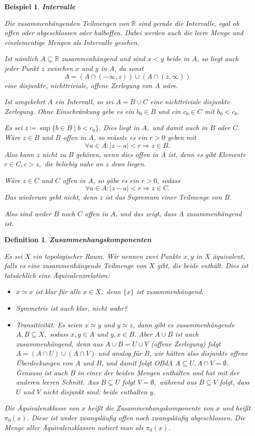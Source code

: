 \documentclass[12pt]{scrbook}   %
\newtheorem{definiX}[alles]{Definition}
\newenvironment{defini}[1]{\begin{definiX}{\bf #1}\par\rm}{\end{definiX}}
\newtheorem{bspX}[alles]{Beispiel}
\newenvironment{bsp}[1]{\begin{bspX}{\bf #1}\par\rm}{\end{bspX}}
\newcommand{\da}{\coloneqq}
\begin{document}
\begin{bsp}{Intervalle}
Die zusammenhängenden Teilmengen von $\mathbb R$ sind gerade die 
Intervalle, egal ob offen oder abgeschlossen oder halboffen. Dabei werden auch 
die leere Menge und einelementige Mengen als Intervalle gesehen.

Ist nämlich $A\subseteq \mathbb R$ zusammenhängend und sind 
$x<y$ beide in $A$, so liegt auch jeder Punkt $z$ zwischen $x$ und $y$ in $A$,
da sonst 
$$A = (A\cap(-\infty,z)) \cup (A\cap (z,\infty))$$
eine disjunkte, nichttriviale, offene Zerlegung von $A$ wäre.

Ist umgekehrt $A$ ein Intervall, so sei $A=B\cup C$ eine nichttriviale
disjunkte Zerlegung. Ohne Einschränkung gebe es ein $b_0\in B$ und ein 
$c_0\in C$ mit $b_0<c_0.$ 

Es sei $z\da \sup\{b\in B\mid b<c_0\}.$ Dies liegt in $A,$ und damit auch in 
$B$ oder $C.$ Wäre $z\in B$ und $B$ offen in $A$, so müsste es ein $r>0$ 
geben mit
$$\forall a\in A: |z-a| < r \Rightarrow z\in B.$$
Also kann $z$ nicht zu $B$ gehören, wenn dies offen in $A$ ist, denn es gibt 
Elemente $c\in C, c>z,$ die beliebig nahe an $z$ dran liegen. 

Wäre $z\in C$ und $C$ offen in $A$, so gäbe es ein $r>0$, sodass
$$\forall a\in A: |z-a| < r \Rightarrow z\in C.$$
Das wiederum geht nicht, denn $z$ ist das Supremum einer Teilmenge von $B.$

Also sind weder $B$ noch $C$ offen in $A$, und das zeigt, dass $A$ 
zusammenhängend ist.

\end{bsp}

\begin{defini}{Zusammenhangskomponenten}
Es sei $X$ ein topologischer Raum. Wir nennen zwei Punkte $x,y$ in $X$
{\it äquivalent}, falls es eine zusammenhängende Teilmenge von $X$ gibt, 
die beide enthält. Dies ist tatsächlich eine Äquivalenzrelation:
\begin{itemize}
\item $x\simeq x$ ist klar für alle $x\in X,$ denn $\{x\}$ ist 
zusammenhängend. 
\item Symmetrie ist auch klar, nicht wahr?
\item Transitivität: Es seien $x\simeq y$ und $y\simeq z$, dann gibt es 
zusammenhängende $A,B\subseteq X,$ sodass $x,y\in A$ und $y,x\in B$. 
Aber $A\cup B$ ist auch zusammenhängend, denn aus $A\cup B = U\cup V$ (offene
Zerlegung) folgt
$A=(A\cap U) \cup (A\cap V)$ und analog für $B$, wir hätten also 
disjunkte offene Überdeckungen von $A$ und $B$, und damit folgt OBdA 
$A\subseteq U, A\cap V = \emptyset.$ Genauso ist auch $B$ in einer der beiden 
Mengen enthalten und hat mit der anderen leeren Schnitt. Aus 
$B\subseteq U$ folgt $V=\emptyset,$ während aus $B\subseteq V$ folgt, dass
$U$ und $V$ nicht disjunkt sind: beide enthalten $y.$
\end{itemize}
Die Äquivalenzklasse von $x$ heißt die {\it Zusammenhangskomponente} von 
$x$ und heißt $\pi_0(x)$. Diese ist weder zwangsläufig offen noch zwangsläufig abgeschlossen. Die Menge aller Äquivalenzklassen notiert man als $\pi_0(x)$.
\end{defini}
\end{document}
